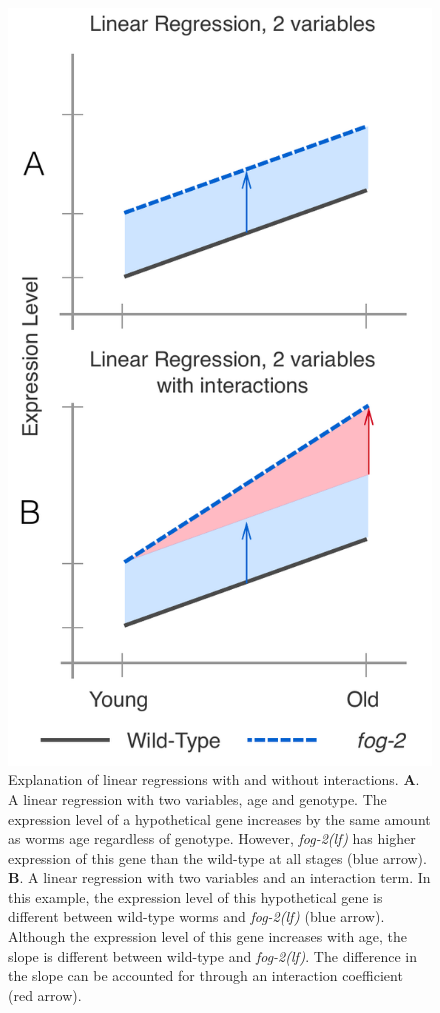 \documentclass[9pt,twocolumn,twoside]{gsag3jnl}
\newcommand{\fog}{\emph{\mbox{fog-2(lf)}}}
\begin{document}
\begin{figure}[htbp]
  \renewcommand{\familydefault}{\sfdefault}\normalfont{}
  \centering
  \includegraphics[width=\linewidth]{../../output/figs/final_figs/linear_regression.pdf}
  \caption{
    Explanation of linear regressions with and without interactions.
    \textbf{A}. A linear regression with two variables, age and genotype. The
    expression level of a hypothetical gene increases by the same amount as
    worms age regardless of genotype. However, \fog{} has higher expression
    of this gene than the wild-type at all stages (blue arrow). \textbf{B}. A
    linear regression with two variables and an interaction term. In this
    example, the expression level of this hypothetical gene is different between
    wild-type worms and \fog{} (blue arrow). Although the expression level of
    this gene increases with age, the slope is different between wild-type and
    \fog{}. The difference in the slope can be accounted for through an
    interaction coefficient (red arrow).
  }
\label{fig:linear_reg}
\end{figure}
\end{document}
